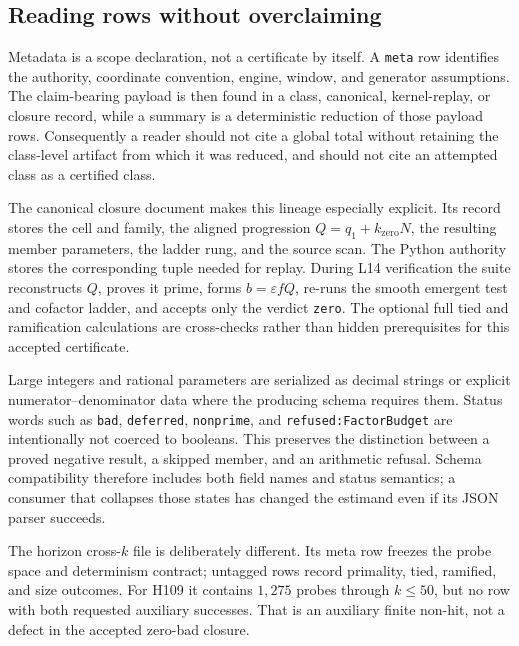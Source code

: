 \documentclass[11pt]{amsart}%
\begin{document}
\subsection{Reading rows without overclaiming}
Metadata is a scope declaration, not a certificate by itself.  A
\texttt{meta} row identifies the authority, coordinate convention, engine,
window, and generator assumptions.  The claim-bearing payload is then found
in a class, canonical, kernel-replay, or closure record, while a summary is a
deterministic reduction of those payload rows.  Consequently a reader should
not cite a global total without retaining the class-level artifact from which
it was reduced, and should not cite an attempted class as a certified class.

The canonical closure document makes this lineage especially explicit.  Its
record stores the cell and family, the aligned progression
\(Q=q_1+k_{\mathrm{zero}}N\), the resulting member parameters, the ladder
rung, and the source scan.  The Python authority stores the corresponding
tuple needed for replay.  During L14 verification the suite reconstructs
\(Q\), proves it prime, forms \(b=\varepsilon fQ\), re-runs the smooth
emergent test and cofactor ladder, and accepts only the verdict
\texttt{zero}.  The optional full tied and ramification calculations are
cross-checks rather than hidden prerequisites for this accepted certificate.

Large integers and rational parameters are serialized as decimal strings or
explicit numerator--denominator data where the producing schema requires
them.  Status words such as \texttt{bad}, \texttt{deferred},
\texttt{nonprime}, and \texttt{refused:FactorBudget} are intentionally not
coerced to booleans.  This preserves the distinction between a proved
negative result, a skipped member, and an arithmetic refusal.  Schema
compatibility therefore includes both field names and status semantics; a
consumer that collapses those states has changed the estimand even if its JSON
parser succeeds.

The horizon cross-\(k\) file is deliberately different.  Its meta row freezes
the probe space and determinism contract; untagged rows record primality,
tied, ramified, and size outcomes.  For H109 it contains \(1{,}275\) probes
through \(k\le 50\), but no row with both requested auxiliary successes.  That
is an auxiliary finite non-hit, not a defect in the accepted zero-bad closure.
\end{document}
